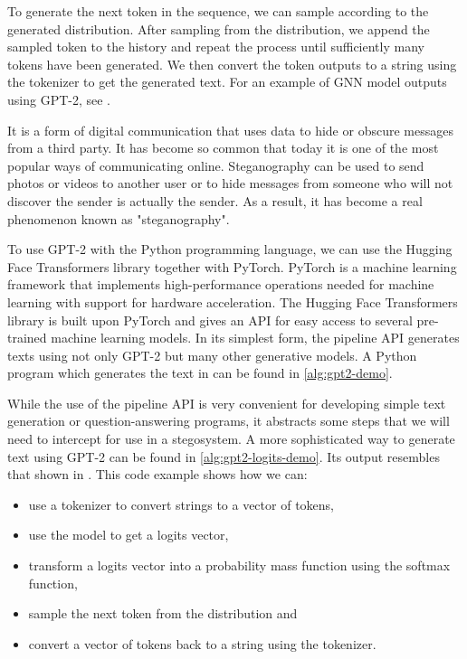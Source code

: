 To generate the next token in the sequence, we can sample according to the generated distribution.
After sampling from the distribution, we append the sampled token to the history and repeat the process until sufficiently many tokens have been generated.
We then convert the token outputs to a string using the tokenizer to get the generated text.
For an example of GNN model outputs using GPT-2, see .

\begin{example}
It is a form of digital communication that uses data to hide or obscure messages from a third party. It has become so common that today it is one of the most popular ways of communicating online. Steganography can be used to send photos or videos to another user or to hide messages from someone who will not discover the sender is actually the sender. As a result, it has become a real phenomenon known as "steganography".
  \label{example:gpt2-output-sample}
\end{example}

To use GPT-2 with the Python programming language, we can use the Hugging Face Transformers library together with PyTorch.
PyTorch \cite{PyTorch} is a machine learning framework that implements high-performance operations needed for machine learning with support for hardware acceleration.
The Hugging Face Transformers library \cite{HFTransformers} is built upon PyTorch and gives an API for easy access to several pre-trained machine learning models.
In its simplest form, the pipeline API generates texts using not only GPT-2 but many other generative models.
A Python program which generates the text in  can be found in \autoref{alg:gpt2-demo}.

While the use of the pipeline API is very convenient for developing simple text generation or question-answering programs, it abstracts some steps that we will need to intercept for use in a stegosystem.
A more sophisticated way to generate text using GPT-2 can be found in \autoref{alg:gpt2-logits-demo}.
Its output resembles that shown in . 
This code example shows how we can:

\begin{itemize}
  \item use a tokenizer to convert strings to a vector of tokens,
  \item use the model to get a logits vector,
  \item transform a logits vector into a probability mass function using the softmax function,
  \item sample the next token from the distribution and
  \item convert a vector of tokens back to a string using the tokenizer.
\end{itemize}

